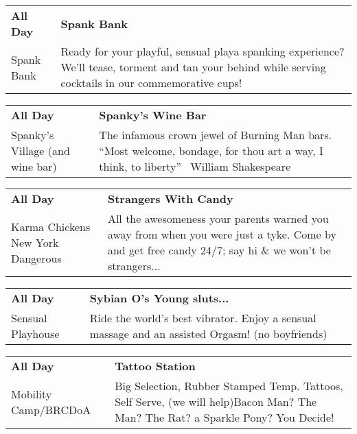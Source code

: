 \begin{tabular}{ p{1in} p{2.2in} }
    \textbf{All Day} & \textbf{Spank Bank} \\
    Spank Bank \newline  & Ready for your playful, sensual playa spanking experience? We'll tease, torment and tan your behind while serving cocktails in our commemorative cups! \\
    \hline 
\end{tabular}
    
\begin{tabular}{ p{1in} p{2.2in} }
    \textbf{All Day} & \textbf{Spanky's Wine Bar} \\
    Spanky's Village (and wine bar) \newline  & The infamous crown jewel of Burning Man bars.  ``Most welcome, bondage, for thou art a way, I think, to liberty''  ~William Shakespeare~ \\
    \hline 
\end{tabular}
    
\begin{tabular}{ p{1in} p{2.2in} }
    \textbf{All Day} & \textbf{Strangers With Candy} \\
    Karma Chickens \newline New York Dangerous & All the awesomeness your parents warned you away from when you were just a tyke. Come by and get free candy 24/7; say hi \& we won't be strangers... \\
    \hline 
\end{tabular}
    
\begin{tabular}{ p{1in} p{2.2in} }
    \textbf{All Day} & \textbf{Sybian O's Young sluts...} \\
    Sensual Playhouse \newline  & Ride the world's best vibrator. Enjoy a sensual massage and an assisted Orgasm! (no boyfriends) \\
    \hline 
\end{tabular}
    
\begin{tabular}{ p{1in} p{2.2in} }
    \textbf{All Day} & \textbf{Tattoo Station} \\
    Mobility Camp/BRCDoA \newline  & Big Selection, Rubber Stamped Temp. Tattoos, Self Serve, (we will help)Bacon Man? The Man? The Rat? a Sparkle Pony? You Decide! \\
    \hline 
\end{tabular}
    
